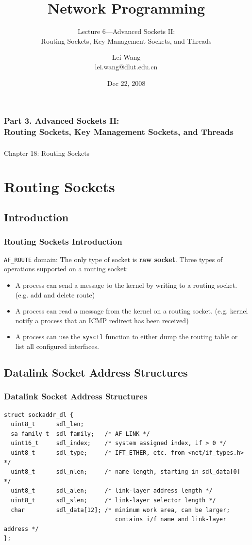 \documentclass[notes,serif]{beamer}
\title{Network Programming}
\subtitle{Lecture 6---Advanced Sockets II: \\ Routing Sockets, Key Management Sockets, and Threads}
\author{Lei Wang\\ lei.wang@dlut.edu.cn}
\institute{Dalian University of Technology}
\date{Dec 22, 2008}
\begin{document}
\begin{frame}
  \titlepage
\end{frame}

\begin{frame}
  \frametitle{Part 3. Advanced Sockets II: \\ Routing Sockets, Key Management Sockets, and Threads}
  \tableofcontents
\end{frame}

\begin{frame}
  \frametitle{}
  \begin{block}{}
    \begin{center}
    {\Large Chapter 18: Routing Sockets}      
    \end{center}
  \end{block}
\end{frame}

\section{Routing Sockets}
\subsection{Introduction}
\begin{frame}
  \frametitle{Routing Sockets Introduction}
  \texttt{AF\_ROUTE} domain: The only type of socket is \textbf{raw socket}.  Three types of operations supported on a routing socket:
  \begin{itemize}
    \item A process can send a message to the kernel by writing to a routing socket. (e.g. add and delete route)
    \item A process can read a message from the kernel on a routing socket.  (e.g. kernel notify a process that an ICMP redirect has been received)
    \item A process can use the \texttt{sysctl} function to either dump the routing table or list all configured interfaces.
  \end{itemize}
\end{frame}

\subsection{Datalink Socket Address Structures}
\begin{frame}[containsverbatim]
  \frametitle{Datalink Socket Address Structures}
  {\tiny
  \begin{verbatim}
struct sockaddr_dl {
  uint8_t      sdl_len;
  sa_family_t  sdl_family;   /* AF_LINK */
  uint16_t     sdl_index;    /* system assigned index, if > 0 */
  uint8_t      sdl_type;     /* IFT_ETHER, etc. from <net/if_types.h> */
  uint8_t      sdl_nlen;     /* name length, starting in sdl_data[0] */
  uint8_t      sdl_alen;     /* link-layer address length */
  uint8_t      sdl_slen;     /* link-layer selector length */
  char         sdl_data[12]; /* minimum work area, can be larger;
                                contains i/f name and link-layer address */
};
  \end{verbatim}
  }
\end{frame}
\end{document}

